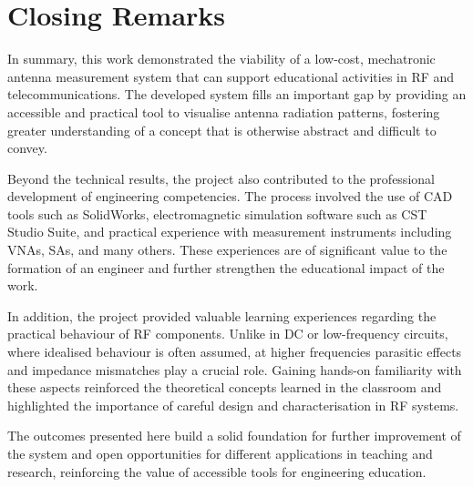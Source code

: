 \section{Closing Remarks}

In summary, this work demonstrated the viability of a low-cost, mechatronic antenna measurement system that can support educational activities in RF and telecommunications. The developed system fills an important gap by providing an accessible and practical tool to visualise antenna radiation patterns, fostering greater understanding of a concept that is otherwise abstract and difficult to convey.

Beyond the technical results, the project also contributed to the professional development of engineering competencies. The process involved the use of CAD tools such as SolidWorks, electromagnetic simulation software such as CST Studio Suite, and practical experience with measurement instruments including VNAs, SAs, and many others. These experiences are of significant value to the formation of an engineer and further strengthen the educational impact of the work.

In addition, the project provided valuable learning experiences regarding the practical behaviour of RF components. Unlike in DC or low-frequency circuits, where idealised behaviour is often assumed, at higher frequencies parasitic effects and impedance mismatches play a crucial role. Gaining hands-on familiarity with these aspects reinforced the theoretical concepts learned in the classroom and highlighted the importance of careful design and characterisation in RF systems.

The outcomes presented here build a solid foundation for further improvement of the system and open opportunities for different applications in teaching and research, reinforcing the value of accessible tools for engineering education.

